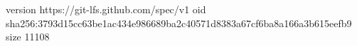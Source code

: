 version https://git-lfs.github.com/spec/v1
oid sha256:3793d15cc63be1ac434e986689ba2c40571d8383a67cf6ba8a166a3b615eefb9
size 11108
